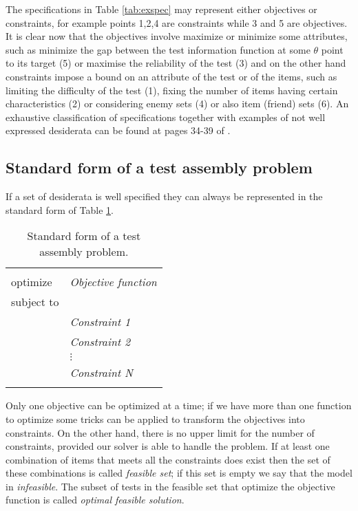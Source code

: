 The specifications in Table \ref{tab:exspec} may represent either objectives or constraints, for example points 1,2,4 are constraints while 3 and 5 are objectives. It is clear now that the objectives involve maximize or minimize some attributes, such as minimize the gap between the test information function at some $\theta$ point to its target (5) or maximise the reliability of the test (3) and on the other hand constraints impose a bound on an attribute of the test or of the items, such as limiting the difficulty of the test (1), fixing the number of items having certain characteristics (2) or considering enemy sets (4) or also item (friend) sets (6). An exhaustive classification of specifications together with examples of not well expressed desiderata can be found at pages 34-39 of \cite{VanDerLinden2005}.



\subsection{Standard form of a test assembly problem}

If a set of desiderata is well specified they can always be represented in the standard form of Table \ref{tab:stform}.

\begin{table}
	\centering
	\begin{tabular}{|ll|}
		\hline	&  \\
		optimize & \textit{Objective function} \\
		subject to & \\
		& \textit{Constraint 1} \\
		& \textit{Constraint 2} \\
		& $\vdots$  \\
		& \textit{Constraint N}  \\
		&  \\
		\hline
	\end{tabular}
	\caption{Standard form of a test assembly problem.}\label{tab:stform}
\end{table}

Only one objective can be optimized at a time; if we have more than one function to optimize some tricks can be applied to transform the objectives into constraints. On the other hand, there is no upper limit for the number of constraints, provided our solver is able to handle the problem. If at least one combination of items that meets all the constraints does exist then the set of these combinations is called \emph{feasible set}; if this set is empty we say that the model in \emph{infeasible}. The subset of tests in the feasible set that optimize the objective function is called \emph{optimal feasible solution}.

